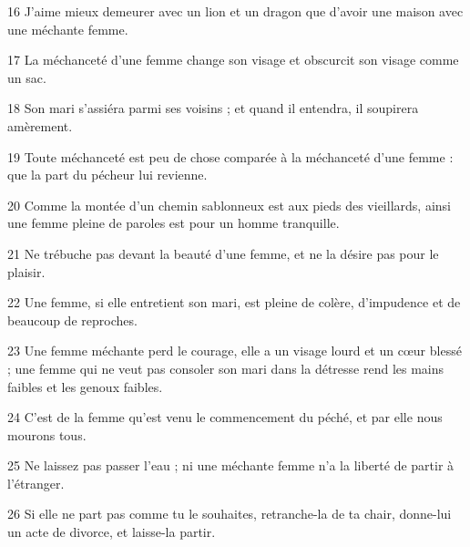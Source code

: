 \par 16 J'aime mieux demeurer avec un lion et un dragon que d'avoir une maison avec une méchante femme.
\par 17 La méchanceté d'une femme change son visage et obscurcit son visage comme un sac.
\par 18 Son mari s'assiéra parmi ses voisins ; et quand il entendra, il soupirera amèrement.
\par 19 Toute méchanceté est peu de chose comparée à la méchanceté d'une femme : que la part du pécheur lui revienne.
\par 20 Comme la montée d'un chemin sablonneux est aux pieds des vieillards, ainsi une femme pleine de paroles est pour un homme tranquille.
\par 21 Ne trébuche pas devant la beauté d'une femme, et ne la désire pas pour le plaisir.
\par 22 Une femme, si elle entretient son mari, est pleine de colère, d'impudence et de beaucoup de reproches.
\par 23 Une femme méchante perd le courage, elle a un visage lourd et un cœur blessé ; une femme qui ne veut pas consoler son mari dans la détresse rend les mains faibles et les genoux faibles.
\par 24 C'est de la femme qu'est venu le commencement du péché, et par elle nous mourons tous.
\par 25 Ne laissez pas passer l'eau ; ni une méchante femme n'a la liberté de partir à l'étranger.
\par 26 Si elle ne part pas comme tu le souhaites, retranche-la de ta chair, donne-lui un acte de divorce, et laisse-la partir.


